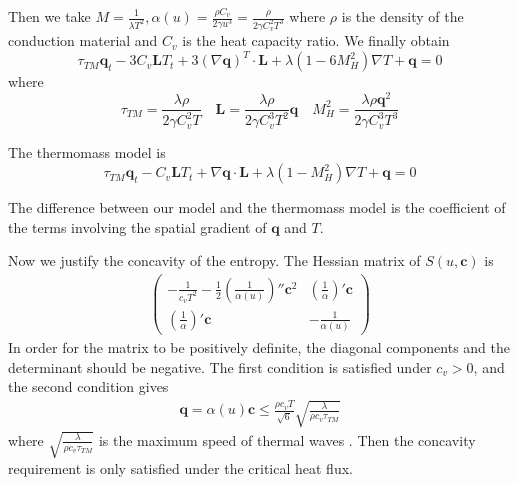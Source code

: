 \documentclass[a4paper]{article}
\begin{document}
Then we take $M=\frac{1}{\lambda T^2}, \alpha(u)=\frac{\rho C_v}{2\gamma u^3}=\frac{\rho}{2\gamma C_v^2 T^3}$
where $\rho$ is the density of the conduction material and $C_v$ is the heat capacity ratio.
We finally obtain
\begin{equation}
\tau_{TM} \mathbf{q}_t-3C_v \mathbf{L}T_t+3(\nabla \mathbf{q})^T \cdot \mathbf{L}+\lambda(1-6M_H^2)\nabla T+\mathbf{q}=0
\end{equation}
where
\begin{equation}
\tau_{TM}=\frac{\lambda \rho}{2 \gamma C_v^2 T} \quad \mathbf{L}=\frac{\lambda \rho}{2 \gamma C_v^3 T^2}\mathbf{q} \quad M_H^2=\frac{\lambda \rho \mathbf{q}^2}{2\gamma C_v^3 T^3}
\end{equation}

The thermomass model is 
\begin{equation}
\tau_{TM} \mathbf{q}_t-C_v \mathbf{L}T_t+\nabla \mathbf{q} \cdot \mathbf{L}+\lambda(1-M_H^2)\nabla T+\mathbf{q}=0
\end{equation}

The difference between our model and the thermomass model is the coefficient of the terms involving the spatial gradient of $\mathbf{q}$ and $T$.

Now we justify the concavity of the entropy. The Hessian matrix of $S(u,\mathbf{c})$ is
\begin{eqnarray}
\left( \begin{array}{ll} -\frac{1}{c_v T^2}-\frac{1}{2}(\frac{1}{\alpha(u)})'' \mathbf{c}^2 & (\frac{1}{\alpha})'\mathbf{c} \\ (\frac{1}{\alpha})'\mathbf{c} & -\frac{1}{\alpha(u)} \end{array} \right)
\end{eqnarray}
In order for the matrix to be positively definite, the diagonal components and the determinant should be negative. The first condition is satisfied under $c_v>0$, and the second condition gives
\begin{eqnarray}
\mathbf{q}=\alpha(u)\mathbf{c} \le \frac{\rho c_v T}{\sqrt{6}} \sqrt{\frac{\lambda}{\rho c_v \tau_{TM}}}
\end{eqnarray}
where $\sqrt{\frac{\lambda}{\rho c_v \tau_{TM}}}$ is the maximum speed of thermal waves \cite{Jou1996extended}. Then the concavity requirement is only satisfied under the critical heat flux.
\end{document}
